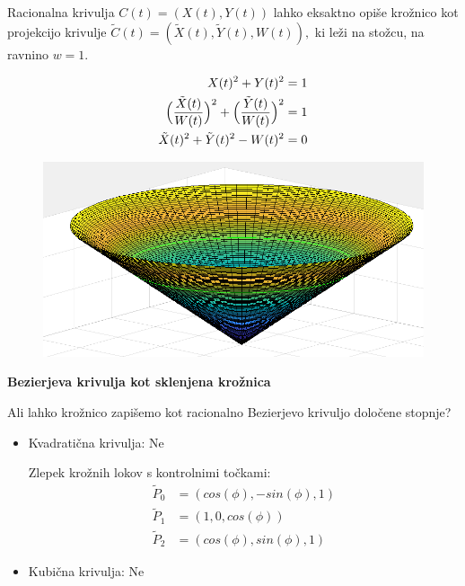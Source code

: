 \documentclass[t]{beamer}
\begin{document}
\begin{frame}
Racionalna krivulja $C(t) = (X(t), Y(t))$ lahko eksaktno opiše krožnico kot projekcijo krivulje
$\tilde{C}(t) = (\tilde{X}(t), \tilde{Y}(t), W(t)),$ ki leži na stožcu, na ravnino $w = 1$.

\begin{align*}
X(t)^2 + Y(t)^2 &= 1 \\
\Big{(}\frac{\tilde{X}(t)}{W(t)}\Big{)}^2 + \Big{(}\frac{\tilde{Y}(t)}{W(t)}\Big{)}^2 &= 1\\
\tilde{X}(t)^2 + \tilde{Y}(t)^2 - W(t)^2 &= 0
\end{align*}
\begin{figure}
\includegraphics[scale=0.2]{stozec.png}
\end{figure}

\end{frame}


\begin{frame}
\textbf{Bezierjeva krivulja kot sklenjena krožnica}

Ali lahko krožnico zapišemo kot racionalno Bezierjevo krivuljo določene stopnje?
\begin{itemize}
\item Kvadratična krivulja: Ne

Zlepek krožnih lokov s kontrolnimi točkami:
\begin{align*}
\tilde{P}_0 &= (cos(\phi), -sin(\phi), 1)\\
\tilde{P}_1 &= (1, 0, cos(\phi))\\
\tilde{P}_2 &= (cos(\phi), sin(\phi), 1)
\end{align*}

\item Kubična krivulja: Ne
\end{itemize}
\end{frame}
\end{document}
